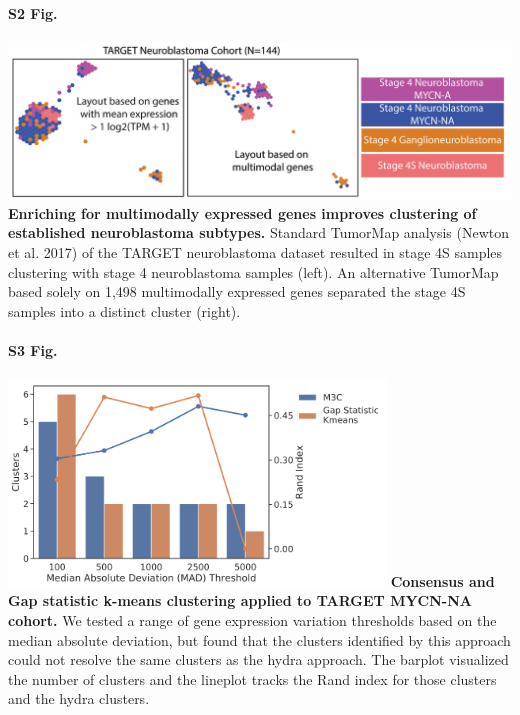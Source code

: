 \documentclass[10pt,letterpaper]{article}
\begin{document}
\paragraph*{S2 Fig.}
\includegraphics[width=\textwidth]{img/TumorMap-NBL-MM-V3-2x}
\label{S2_Fig}
{\bf Enriching for multimodally expressed genes improves clustering of established neuroblastoma subtypes.} Standard TumorMap analysis (Newton et al. 2017) of the TARGET neuroblastoma dataset resulted in stage 4S samples clustering with stage 4 neuroblastoma samples (left). An alternative TumorMap based solely on 1,498 multimodally expressed genes separated the stage 4S samples into a distinct cluster (right).

\paragraph*{S3 Fig.}
\includegraphics[width=0.75\textwidth]{img/clustering-screen}
\label{S3_Fig}
{\bf{Consensus and Gap statistic k-means clustering applied to TARGET MYCN-NA cohort.}} We tested a range of gene expression variation thresholds based on the median absolute deviation, but found that the clusters identified by this approach could not resolve the same clusters as the hydra approach. The barplot visualized the number of clusters and the lineplot tracks the Rand index for those clusters and the hydra clusters.
\end{document}
